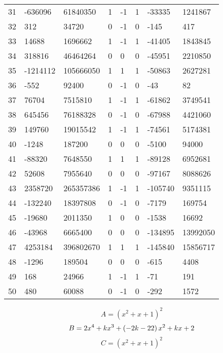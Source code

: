 \documentclass{amsart}
\begin{document}
\begin{longtable}{|l|l|l|lllll|}
31&-636096&61840350&1&-1&1&-33335&1241867\\
32&312&34720&0&-1&0&-145&417\\
33&14688&1696662&1&-1&1&-41405&1843845\\
34&318816&46464264&0&0&0&-45951&2210850\\
35&-1214112&105666050&1&1&1&-50863&2627281\\
36&-552&92400&0&-1&0&-43&82\\
37&76704&7515810&1&-1&1&-61862&3749541\\
38&645456&76188328&0&-1&0&-67988&4421060\\
39&149760&19015542&1&-1&1&-74561&5174381\\
40&-1248&187200&0&0&0&-5100&94000\\
41&-88320&7648550&1&1&1&-89128&6952681\\
42&52608&7955640&0&0&0&-97167&8088626\\
43&2358720&265357386&1&-1&1&-105740&9351115\\
44&-132240&18397808&0&-1&0&-7179&169754\\
45&-19680&2011350&1&0&0&-1538&16692\\
46&-43968&6665400&0&0&0&-134895&13992050\\
47&4253184&396802670&1&1&1&-145840&15856717\\
48&-1296&189504&0&0&0&-615&4408\\
49&168&24966&1&-1&1&-71&191\\
50&480&60088&0&-1&0&-292&1572\\
\hline
\end{longtable}
$$A=(x^2
 + x
 + 1)^{2}$$
$$B=2\*x^4
 + k\*x^3
 + \left(-2\*k
 - 22\right) \*x^2
 + k\*x
 + 2$$
$$C=(x^2
 + x
 + 1)^{2}$$
\end{document}
